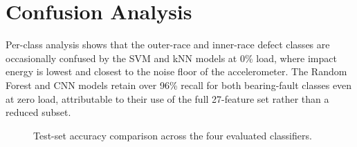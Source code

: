 \section{Confusion Analysis}
Per-class analysis shows that the outer-race and inner-race defect classes are occasionally
confused by the SVM and kNN models at 0\% load, where impact energy is lowest and closest to the
noise floor of the accelerometer. The Random Forest and CNN models retain over 96\% recall for
both bearing-fault classes even at zero load, attributable to their use of the full 27-feature
set rather than a reduced subset.

\begin{figure}[!ht]
\centering
{}
\caption{Test-set accuracy comparison across the four evaluated classifiers.}
\label{fig:barchart}
\end{figure}
